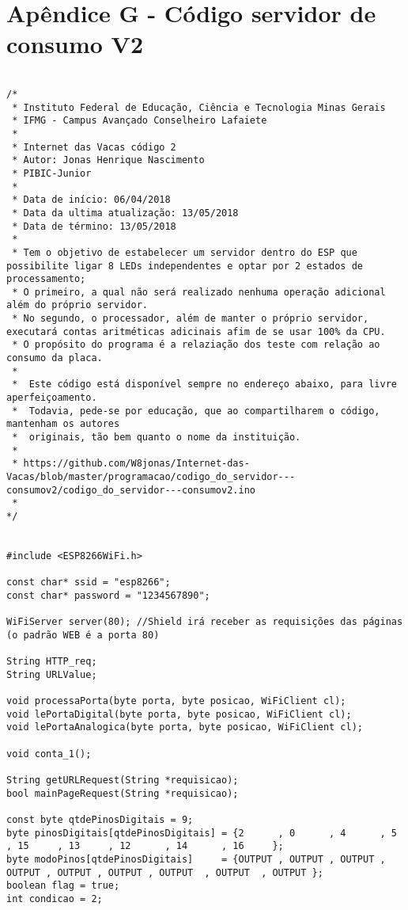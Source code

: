 \newpage
\section{Apêndice G - Código servidor de consumo V2}
\label{sc:apendice_g_}

\begin{lstlisting}

/*
 * Instituto Federal de Educação, Ciência e Tecnologia Minas Gerais
 * IFMG - Campus Avançado Conselheiro Lafaiete 
 * 
 * Internet das Vacas código 2
 * Autor: Jonas Henrique Nascimento
 * PIBIC-Junior
 * 
 * Data de início: 06/04/2018
 * Data da ultima atualização: 13/05/2018
 * Data de término: 13/05/2018
 * 
 * Tem o objetivo de estabelecer um servidor dentro do ESP que possibilite ligar 8 LEDs independentes e optar por 2 estados de processamento;
 * O primeiro, a qual não será realizado nenhuma operação adicional além do próprio servidor.
 * No segundo, o processador, além de manter o próprio servidor, executará contas aritméticas adicinais afim de se usar 100% da CPU.
 * O propósito do programa é a relaziação dos teste com relação ao consumo da placa.
 *
 *  Este código está disponível sempre no endereço abaixo, para livre aperfeiçoamento. 
 *  Todavia, pede-se por educação, que ao compartilharem o código, mantenham os autores
 *  originais, tão bem quanto o nome da instituição.
 *
 * https://github.com/W8jonas/Internet-das-Vacas/blob/master/programacao/codigo_do_servidor---consumov2/codigo_do_servidor---consumov2.ino
 *  
*/


#include <ESP8266WiFi.h>

const char* ssid = "esp8266";
const char* password = "1234567890";

WiFiServer server(80); //Shield irá receber as requisições das páginas (o padrão WEB é a porta 80)

String HTTP_req; 
String URLValue;

void processaPorta(byte porta, byte posicao, WiFiClient cl);
void lePortaDigital(byte porta, byte posicao, WiFiClient cl);
void lePortaAnalogica(byte porta, byte posicao, WiFiClient cl);

void conta_1();
  
String getURLRequest(String *requisicao);
bool mainPageRequest(String *requisicao);

const byte qtdePinosDigitais = 9;
byte pinosDigitais[qtdePinosDigitais] = {2      , 0      , 4      , 5      , 15     , 13     , 12      , 14      , 16     };
byte modoPinos[qtdePinosDigitais]     = {OUTPUT , OUTPUT , OUTPUT , OUTPUT , OUTPUT , OUTPUT , OUTPUT  , OUTPUT  , OUTPUT };
boolean flag = true;
int condicao = 2;




\end{lstlisting}
